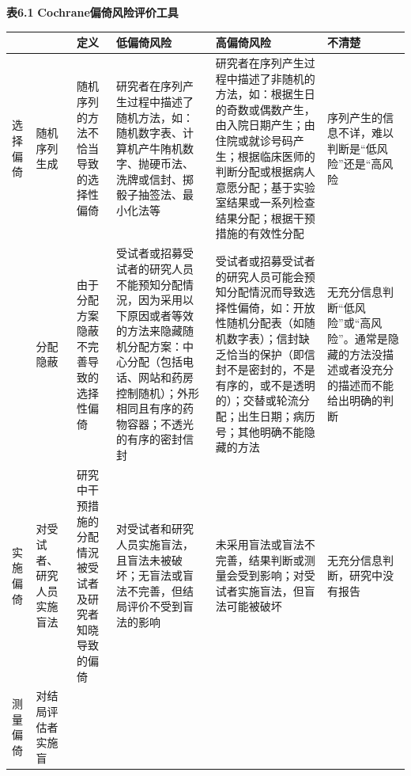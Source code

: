\documentclass[
  chinese-hans,
  letterpaper,
  DIV=11,
  numbers=noendperiod]{scrreprt}
\newcounter{none} %
\begin{document}
\textbf{表6.1} \textbf{Cochrane偏倚风险评价工具}

{\def\LTcaptype{none} %
\begin{longtable}[]{@{}
  >{\raggedright\arraybackslash}p{}
  >{\raggedright\arraybackslash}p{}
  >{\raggedright\arraybackslash}p{}
  >{\raggedright\arraybackslash}p{}
  >{\raggedright\arraybackslash}p{}
  >{\raggedright\arraybackslash}p{}@{}}
\toprule\noalign{}
\begin{minipage}[b]{\linewidth}\raggedright
\end{minipage} & \begin{minipage}[b]{\linewidth}\raggedright
\end{minipage} & \begin{minipage}[b]{\linewidth}\raggedright
定义
\end{minipage} & \begin{minipage}[b]{\linewidth}\raggedright
低偏倚风险
\end{minipage} & \begin{minipage}[b]{\linewidth}\raggedright
高偏倚风险
\end{minipage} & \begin{minipage}[b]{\linewidth}\raggedright
不清楚
\end{minipage} \\
\midrule\noalign{}
\endhead
\bottomrule\noalign{}
\endlastfoot
选择偏倚 & 随机序列生成 & 随机序列的方法不恰当导致的选择性偏倚 &
研究者在序列产生过程中描述了随机方法，如：随机数字表、计算机产牛陏机数字、抛硬币法、洗牌或信封、掷骰子抽签法、最小化法等
&
研究者在序列产生过程中描述了非随机的方法，如：根据生日的奇数或偶数产生，由入院日期产生；由住院或就诊号码产生；根据临床医师的判断分配或根据病人意愿分配；基于实验室结果或一系列检查结果分配；根据干预措施的有效性分配
& 序列产生的信息不详，难以判断是``低风险''还是``高风险 \\
& 分配隐蔽 & 由于分配方案隐蔽不完善导致的选择性偏倚 &
受试者或招募受试者的研究人员不能预知分配情況，因为采用以下原因或者等效的方法来隐藏随机分配方案：中心分配（包括电话、网站和药房控制随机）；外形相同且有序的药物容器；不透光的有序的密封信封
&
受试者或招募受试者的研究人员可能会预知分配情況而导致选择性偏倚，如：开放性随机分配表（如随机数字表）；信封缺乏恰当的保护（即信封不是密封的，不是有序的，或不是透明的）；交替或轮流分配；出生日期；病历号；其他明确不能隐藏的方法
&
无充分信息判断``低风险''或``高风险''。通常是隐藏的方法没描述或者没充分的描述而不能给出明确的判断 \\
实施偏倚 & 对受试者、研究人员实施盲法 &
研究中干预措施的分配情況被受试者及研究者知晓导致的偏倚 &
对受试者和研究人员实施盲法，且盲法未被破坏；无盲法或盲法不完善，但结局评价不受到盲法的影响
&
未采用盲法或盲法不完善，结果判断或测量会受到影响；对受试者实施盲法，但盲法可能被破坏
& 无充分信息判断，研究中没有报告 \\
测量偏倚 & 对结局评估者实施盲


\end{longtable}}
\end{document}
